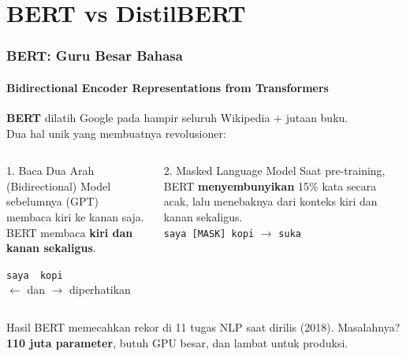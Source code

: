 \documentclass[t,aspectratio=169,xcolor=dvipsnames]{beamer}
\begin{document}
\section{BERT vs DistilBERT}

\begin{frame}[shrink=4]
    \frametitle{BERT: Guru Besar Bahasa}
    \framesubtitle{Bidirectional Encoder Representations from Transformers}
    \small
    \textbf{BERT} dilatih Google pada hampir seluruh Wikipedia + jutaan buku.\\[-0.1em]
    Dua hal unik yang membuatnya revolusioner:

    \vspace{0.2em}
    \begin{columns}[T]
        \begin{block}{1. Baca Dua Arah (Bidirectional)}
            \footnotesize
            Model sebelumnya (GPT) membaca kiri ke kanan saja.\\[0.2em]
            BERT membaca \textbf{kiri dan kanan sekaligus}.
            \begin{center}
            \small\texttt{saya \underline{\hspace{0.7cm}} kopi}\\
            \small\textcolor{nyublue}{$\leftarrow$ dan $\rightarrow$ diperhatikan}
            \end{center}
        \end{block}

        \begin{block}{2. Masked Language Model}
            \footnotesize
            Saat pre-training, BERT \textbf{menyembunyikan} 15\% kata secara acak, lalu menebaknya dari konteks kiri dan kanan sekaligus.\\[0.2em]
            \texttt{saya [MASK] kopi} $\to$ \texttt{suka}
        \end{block}
    \end{columns}

    \vspace{0.2em}
    \begin{exampleblock}{Hasil}
        \footnotesize
        BERT memecahkan rekor di 11 tugas NLP saat dirilis (2018). Masalahnya? \textbf{110 juta parameter}, butuh GPU besar, dan lambat untuk produksi.
    \end{exampleblock}
\end{frame}
\end{document}
